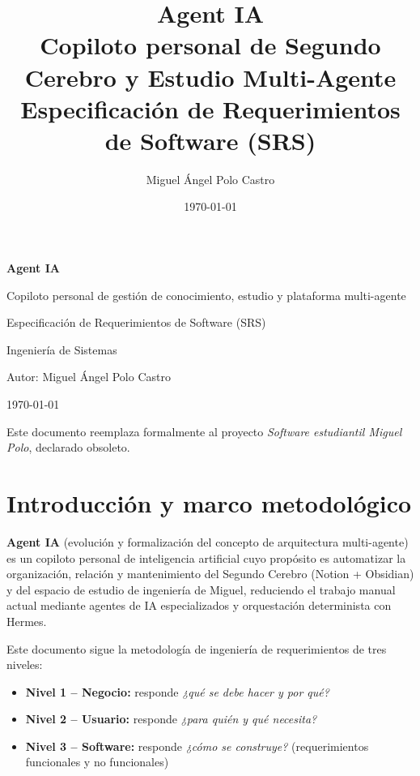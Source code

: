 \documentclass[11pt,a4paper]{article}
\title{\textbf{Agent IA}\\[0.3cm]\Large Copiloto personal de Segundo Cerebro y Estudio Multi-Agente\\[0.2cm]\large Especificación de Requerimientos de Software (SRS)}
\author{Miguel Ángel Polo Castro}
\date{\today}
\begin{document}
\begin{titlepage}
\centering
\vspace*{3cm}
{\Huge\bfseries Agent IA \par}
\vspace{0.5cm}
{\Large Copiloto personal de gestión de conocimiento, estudio y plataforma multi-agente \par}
\vspace{1.5cm}
{\large Especificación de Requerimientos de Software (SRS) \par}
\vspace{0.3cm}
{\large Ingeniería de Sistemas \par}
\vspace{3cm}
{\large Autor: Miguel Ángel Polo Castro \par}
\vspace{0.3cm}
{\large \today \par}
\vfill
{\small Este documento reemplaza formalmente al proyecto \emph{Software estudiantil Miguel Polo}, declarado obsoleto. \par}
\end{titlepage}

\tableofcontents
\newpage

\section{Introducción y marco metodológico}

\textbf{Agent IA} (evolución y formalización del concepto de arquitectura multi-agente) es un copiloto personal de inteligencia artificial cuyo propósito es automatizar la organización, relación y mantenimiento del Segundo Cerebro (Notion + Obsidian) y del espacio de estudio de ingeniería de Miguel, reduciendo el trabajo manual actual mediante agentes de IA especializados y orquestación determinista con Hermes.

Este documento sigue la metodología de ingeniería de requerimientos de tres niveles:

\begin{itemize}[leftmargin=1.4cm]
  \item \textbf{Nivel 1 -- Negocio:} responde \emph{¿qué se debe hacer y por qué?}
  \item \textbf{Nivel 2 -- Usuario:} responde \emph{¿para quién y qué necesita?}
  \item \textbf{Nivel 3 -- Software:} responde \emph{¿cómo se construye?} (requerimientos funcionales y no funcionales)
\end{itemize}
\end{document}
